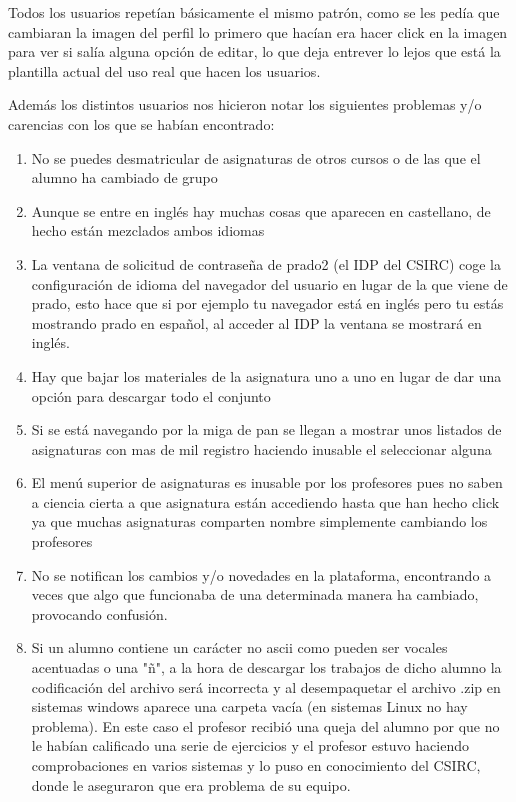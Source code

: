 Todos los usuarios repetían básicamente el mismo patrón, como se les pedía que cambiaran la imagen del perfil lo primero que hacían era hacer click en la imagen para ver si salía alguna opción de editar, lo que deja entrever lo lejos que está la plantilla actual del uso real que hacen los usuarios. 

Además los distintos usuarios nos hicieron notar los siguientes problemas y/o carencias con los que se habían encontrado:

\begin{enumerate}


\item No se puedes desmatricular de asignaturas de otros cursos o de las que el alumno ha cambiado de grupo


\item Aunque se entre en inglés hay muchas cosas que aparecen en castellano, de hecho están mezclados ambos idiomas

\item La ventana de solicitud de contraseña de prado2 (el IDP del CSIRC) coge la configuración de idioma del navegador del usuario en lugar de la que viene de prado, esto hace que si por ejemplo tu navegador está en inglés pero tu estás mostrando prado en español, al acceder al IDP la ventana se mostrará en inglés.


\item Hay que bajar los materiales de la asignatura uno a uno en lugar de dar una opción para descargar todo el conjunto

\item Si se está navegando por la miga de pan se llegan a mostrar unos listados de asignaturas con mas de mil registro haciendo inusable el seleccionar alguna

\item El menú superior de asignaturas es inusable por los profesores pues no saben a ciencia cierta a que asignatura están accediendo hasta que han hecho click ya que muchas asignaturas comparten nombre simplemente cambiando los profesores

\item No se notifican los cambios y/o novedades en la plataforma, encontrando a veces que algo que funcionaba de una determinada manera ha cambiado, provocando confusión.

\item Si un alumno contiene un carácter no ascii como pueden ser vocales acentuadas o una "ñ", a la hora de descargar los trabajos de dicho alumno la codificación del archivo será incorrecta y al desempaquetar el archivo .zip en sistemas windows aparece una carpeta vacía (en sistemas Linux no hay problema). En este caso el profesor recibió una queja del alumno por que no le habían calificado una serie de ejercicios y el profesor estuvo haciendo comprobaciones en varios sistemas y lo puso en conocimiento del CSIRC, donde le aseguraron que era problema de su equipo. 


\end{enumerate}
